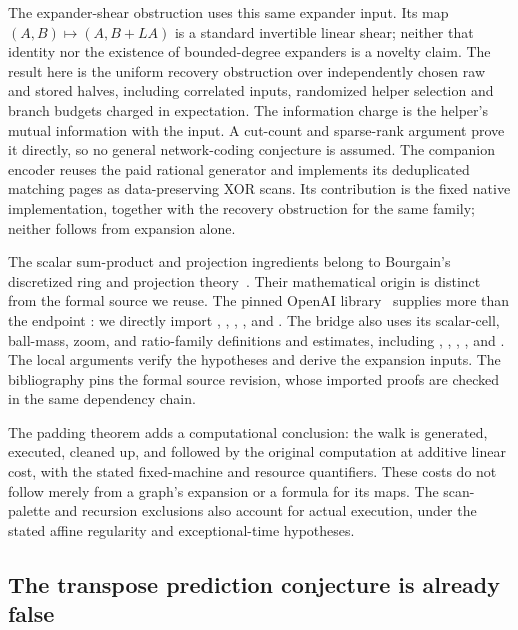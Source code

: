 The expander-shear obstruction uses this same expander input. Its map
$(A,B)\mapsto(A,B+LA)$ is a standard invertible linear shear; neither that
identity nor the existence of bounded-degree expanders is a novelty claim.
The result here is the uniform recovery obstruction over independently
chosen raw and stored halves, including correlated inputs, randomized helper
selection and branch budgets charged in expectation. The information charge
is the helper's mutual information with the input. A cut-count and sparse-rank argument prove it directly, so no
general network-coding conjecture is assumed.
The companion encoder reuses the paid rational generator and implements
its deduplicated matching pages as data-preserving XOR scans. Its contribution
is the fixed native implementation, together with the recovery obstruction
for the same family; neither follows from expansion alone.

The scalar sum-product and projection ingredients belong to Bourgain's
discretized ring and projection theory~\cite{Bourgain2003,Bourgain2010}.
Their mathematical origin is distinct from the formal source we reuse.
The pinned OpenAI library~\cite{OAIProjection2026} supplies more than the
endpoint : we directly import
, ,
, , and
. The bridge also uses its scalar-cell,
ball-mass, zoom, and ratio-family definitions and estimates, including
, ,
,
, and
.
The local arguments verify the hypotheses and derive the expansion inputs.
The bibliography pins the formal source revision, whose imported proofs are
checked in the same dependency chain.

The padding theorem adds a computational conclusion: the walk is generated,
executed, cleaned up, and followed by the original computation at additive
linear cost, with the stated fixed-machine and resource quantifiers.
These costs do not follow merely from a graph's expansion or a formula for
its maps. The scan-palette and recursion exclusions also account for actual
execution, under the stated affine regularity and exceptional-time hypotheses.

\subsection{The transpose prediction conjecture is already false}

